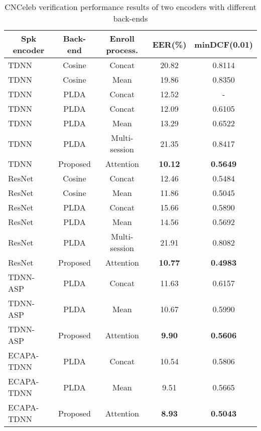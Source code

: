 \documentclass{article}
\begin{document}
\setlength{\tabcolsep}{1.0mm}
\begin{table}[t]
\footnotesize
  \caption{CNCeleb verification performance results of two encoders with different back-ends}
  
  \label{tab:result_cn}
  \vspace{2mm}
  \centering
  \begin{tabular}{l c c c c}
    \toprule
    \multicolumn{1}{c}{\textbf{Spk encoder}} & \multicolumn{1}{c}{\textbf{Back-end}} & \multicolumn{1}{c}{\textbf{Enroll process.}} & \multicolumn{1}{c}{\textbf{EER(\%)}} & \multicolumn{1}{c}{\textbf{minDCF(0.01)}}\\
    \midrule
    TDNN   & Cosine         & Concat         & 20.82           & 0.8114                \\
    TDNN   & Cosine         & Mean           & 19.86           & 0.8350                \\
    TDNN \cite{Li2020-CN2}  & PLDA & Concat  & 12.52           & -                     \\
    TDNN   & PLDA           & Concat         & 12.09           & 0.6105                \\
    TDNN   & PLDA           & Mean           & 13.29           & 0.6522                \\
    TDNN   & PLDA           & Multi-session  & 21.35           & 0.8417                \\
    TDNN   & Proposed       & Attention      & \textbf{10.12}  & \textbf{0.5649}       \\ \midrule
    ResNet & Cosine         & Concat         & 12.46           & 0.5484                \\
    ResNet & Cosine         & Mean           & 11.86           & 0.5045                \\
    ResNet & PLDA           & Concat         & 15.66           & 0.5890                \\
    ResNet & PLDA           & Mean           & 14.56           & 0.5692                \\
    ResNet & PLDA           & Multi-session  & 21.91           & 0.8082                \\
    ResNet & Proposed       & Attention      & \textbf{10.77}  & \textbf{0.4983}       \\ \midrule
    TDNN-ASP & PLDA         & Concat         & 11.63           & 0.6157                \\
    TDNN-ASP & PLDA         & Mean           & 10.67           & 0.5990                \\
    TDNN-ASP & Proposed     & Attention      & \textbf{9.90}   & \textbf{0.5606}       \\
    ECAPA-TDNN & PLDA       & Concat         & 10.54           & 0.5806                \\
    ECAPA-TDNN & PLDA       & Mean           & 9.51            & 0.5665                \\
    ECAPA-TDNN & Proposed   & Attention      & \textbf{8.93}   & \textbf{0.5043}       \\
    \bottomrule
  \end{tabular}
  \vspace{-5mm}
\end{table}
\end{document}
